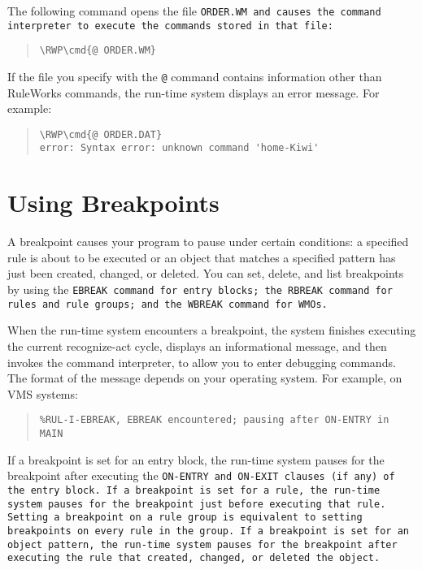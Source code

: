 The following command opens the file \tt{ORDER.WM} and causes the
command interpreter to execute the commands stored in that file:

\begin{quote}
\begin{Verbatim}[commandchars=\\\{\}]
\RWP\cmd{@ ORDER.WM}
\end{Verbatim}
\end{quote}

If the file you specify with the \verb|@| command contains information
other than RuleWorks commands, the run-time system displays an error
message. For example:

\begin{quote}
\begin{Verbatim}[commandchars=\\\{\}]
\RWP\cmd{@ ORDER.DAT}
error: Syntax error: unknown command 'home-Kiwi'
\end{Verbatim}
\end{quote}

\section{Using Breakpoints}

A breakpoint causes your program to pause under certain conditions: a
specified rule is about to be executed or an object that matches a
specified pattern has just been created, changed, or deleted. You can
set, delete, and list breakpoints by using the \tt{EBREAK} command for
entry blocks; the \tt{RBREAK} command for rules and rule groups; and
the \tt{WBREAK} command for WMOs.

When the run-time system encounters a breakpoint, the system finishes
executing the current recognize-act cycle, displays an informational
message, and then invokes the command interpreter, to allow you to
enter debugging commands. The format of the message depends on your
operating system. For example, on VMS systems:

\begin{quote}
\begin{verbatim}
%RUL-I-EBREAK, EBREAK encountered; pausing after ON-ENTRY in MAIN
\end{verbatim}
\end{quote}

If a breakpoint is set for an entry block, the run-time system pauses
for the breakpoint after executing the \tt{ON-ENTRY} and \tt{ON-EXIT}
clauses (if any) of the entry block. If a breakpoint is set for a
rule, the run-time system pauses for the breakpoint just before
executing that rule. Setting a breakpoint on a rule group is
equivalent to setting breakpoints on every rule in the group. If a
breakpoint is set for an object pattern, the run-time system pauses
for the breakpoint after executing the rule that created, changed, or
deleted the object.

